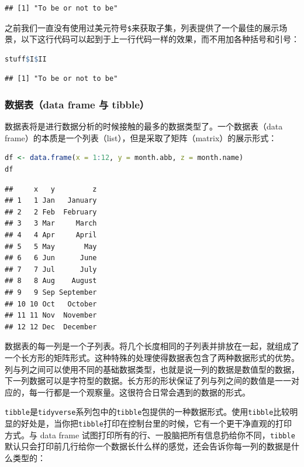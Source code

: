 \documentclass[]{ctexbook}
\newcommand{\passthrough}[1]{#1}
\begin{document}
\begin{lstlisting}
## [1] "To be or not to be"
\end{lstlisting}

之前我们一直没有使用过美元符号\passthrough{\lstinline!$!}来获取子集，列表提供了一个最佳的展示场景，以下这行代码可以起到于上一行代码一样的效果，而不用加各种括号和引号：

\begin{lstlisting}[language=R]
stuff$I$II
\end{lstlisting}

\begin{lstlisting}
## [1] "To be or not to be"
\end{lstlisting}

\hypertarget{ux6570ux636eux8868data-frame-ux4e0e-tibble}{%
\subsubsection{数据表（data frame 与 tibble）}\label{ux6570ux636eux8868data-frame-ux4e0e-tibble}}

数据表将是进行数据分析的时候接触的最多的数据类型了。一个数据表（data frame）的本质是一个列表（list），但是采取了矩阵（matrix）的展示形式：

\begin{lstlisting}[language=R]
df <- data.frame(x = 1:12, y = month.abb, z = month.name)
df
\end{lstlisting}

\begin{lstlisting}
##     x   y         z
## 1   1 Jan   January
## 2   2 Feb  February
## 3   3 Mar     March
## 4   4 Apr     April
## 5   5 May       May
## 6   6 Jun      June
## 7   7 Jul      July
## 8   8 Aug    August
## 9   9 Sep September
## 10 10 Oct   October
## 11 11 Nov  November
## 12 12 Dec  December
\end{lstlisting}

数据表的每一列是一个子列表。将几个长度相同的子列表并排放在一起，就组成了一个长方形的矩阵形式。这种特殊的处理使得数据表包含了两种数据形式的优势。列与列之间可以使用不同的基础数据类型，也就是说一列的数据是数值型的数据，下一列数据可以是字符型的数据。长方形的形状保证了列与列之间的数值是一一对应的，每一行都是一个观察量。这很符合日常会遇到的数据的形式。

\passthrough{\lstinline!tibble!}是\passthrough{\lstinline!tidyverse!}系列包中的\passthrough{\lstinline!tibble!}包提供的一种数据形式。使用\passthrough{\lstinline!tibble!}比较明显的好处是，当你把\passthrough{\lstinline!tibble!}打印在控制台里的时候，它有一个更干净直观的打印方式。与 data frame 试图打印所有的行、一股脑把所有信息扔给你不同，\passthrough{\lstinline!tibble!} 默认只会打印前几行给你一个数据长什么样的感觉，还会告诉你每一列的数据是什么类型的：
\end{document}
